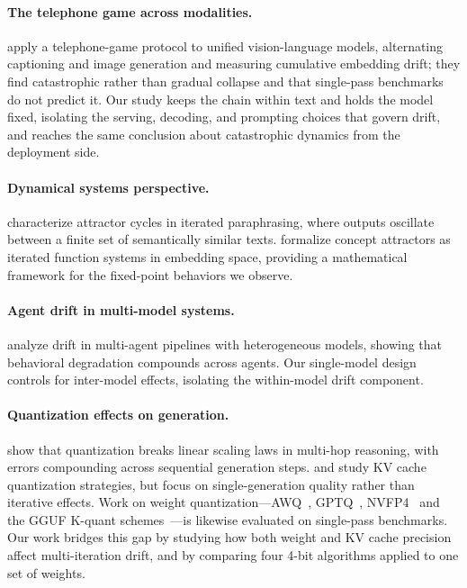 \documentclass[11pt]{article}
\begin{document}
\paragraph{The telephone game across modalities.}
\citet{mollah2025telephone} apply a telephone-game protocol to unified
vision-language models, alternating captioning and image generation and measuring
cumulative embedding drift; they find catastrophic rather than gradual collapse
and that single-pass benchmarks do not predict it. Our study keeps the chain
within text and holds the model fixed, isolating the serving, decoding, and
prompting choices that govern drift, and reaches the same conclusion about
catastrophic dynamics from the deployment side.

\paragraph{Dynamical systems perspective.}
\citet{wang2025attractor} characterize attractor cycles in iterated paraphrasing,
where outputs oscillate between a finite set of semantically similar texts.
\citet{chytas2025concept} formalize concept attractors as iterated function systems
in embedding space, providing a mathematical framework for the fixed-point behaviors
we observe.

\paragraph{Agent drift in multi-model systems.}
\citet{rath2026agent} analyze drift in multi-agent pipelines with heterogeneous
models, showing that behavioral degradation compounds across agents. Our single-model
design controls for inter-model effects, isolating the within-model drift component.

\paragraph{Quantization effects on generation.}
\citet{han2026quantization} show that quantization breaks linear scaling laws in
multi-hop reasoning, with errors compounding across sequential generation steps.
\citet{hooper2024kvquant} and \citet{liu2024kivi} study KV cache quantization
strategies, but focus on single-generation quality rather than iterative effects.
Work on weight quantization---AWQ~\citep{lin2024awq},
GPTQ~\citep{frantar2023gptq}, NVFP4~\citep{nvidia2025nvfp4} and the GGUF K-quant
schemes~\citep{gerganov_llamacpp}---is likewise evaluated on single-pass
benchmarks. Our work bridges this gap by studying how both weight and KV cache
precision affect multi-iteration drift, and by comparing four 4-bit algorithms
applied to one set of weights.
\end{document}
